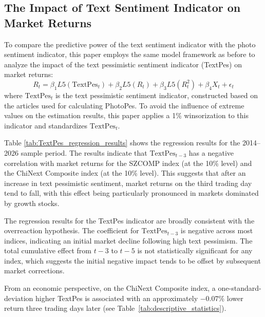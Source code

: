 \documentclass[AER]{AEA}
\begin{document}
\subsection{The Impact of Text Sentiment Indicator on Market Returns}
\label{sec:textpes_marginal}
To compare the predictive power of the text sentiment indicator with the photo sentiment indicator, this paper employs the same model framework as before to analyze the impact of the text pessimistic sentiment indicator (TextPes) on market returns:
\begin{equation}
R_t = \beta_1 L5(\text{TextPes}_t) + \beta_2 L5(R_t) + \beta_3 L5(R_t^2) + \beta_4 X_t + \epsilon_t
\end{equation}
where $\text{TextPes}_t$ is the text pessimistic sentiment indicator, constructed based on the articles used for calculating PhotoPes. To avoid the influence of extreme values on the estimation results, this paper applies a 1\% winsorization to this indicator and standardizes $\text{TextPes}_t$.

Table \ref{tab:TextPes_regression_results} shows the regression results for the 2014--2026 sample period. The results indicate that $\text{TextPes}_{t-3}$ has a negative correlation with market returns for the SZCOMP index (at the 10\% level) and the ChiNext Composite index (at the 10\% level). This suggests that after an increase in text pessimistic sentiment, market returns on the third trading day tend to fall, with this effect being particularly pronounced in markets dominated by growth stocks.

The regression results for the TextPes indicator are broadly consistent with the overreaction hypothesis. The coefficient for $\text{TextPes}_{t-3}$ is negative across most indices, indicating an initial market decline following high text pessimism. The total cumulative effect from $t-3$ to $t-5$ is not statistically significant for any index, which suggests the initial negative impact tends to be offset by subsequent market corrections.

From an economic perspective, on the ChiNext Composite index, a one-standard-deviation higher TextPes is associated with an approximately $-0.07\%$ lower return three trading days later (see Table~\ref{tab:descriptive_statistics}).
\end{document}
